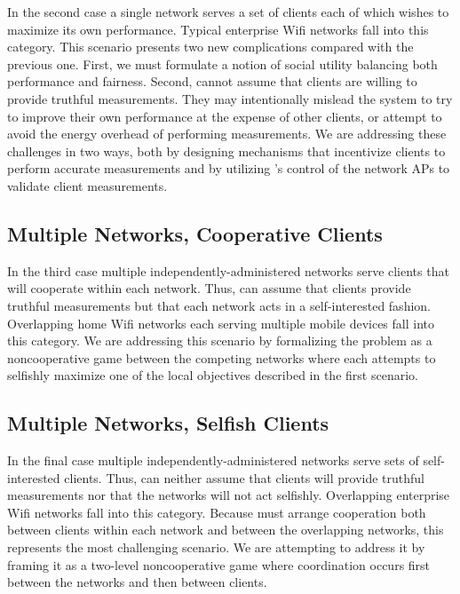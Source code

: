 In the second case a single network serves a set of clients each of which
wishes to maximize its own performance. Typical enterprise Wifi networks fall
into this category. This scenario presents two new complications compared
with the previous one. First, we must formulate a notion of social utility
balancing both performance and fairness. Second, \PS{} cannot assume that
clients are willing to provide truthful measurements. They may intentionally
mislead the system to try to improve their own performance at the expense of
other clients, or attempt to avoid the energy overhead of performing
measurements. We are addressing these challenges in two ways, both by
designing mechanisms that incentivize clients to perform accurate
measurements and by utilizing \PS{}'s control of the network APs to validate
client measurements.

\subsection{Multiple Networks, Cooperative Clients}

In the third case multiple independently-administered networks serve clients
that will cooperate within each network. Thus, \PS{} can assume that clients
provide truthful measurements but that each network acts in a self-interested
fashion. Overlapping home Wifi networks each serving multiple mobile devices
fall into this category. We are addressing this scenario by formalizing the
problem as a noncooperative game between the competing networks where each
attempts to selfishly maximize one of the local objectives described in the
first scenario.

\subsection{Multiple Networks, Selfish Clients}

In the final case multiple independently-administered networks serve sets of
self-interested clients. Thus, \PS{} can neither assume that clients will
provide truthful measurements nor that the networks will not act selfishly.
Overlapping enterprise Wifi networks fall into this category. Because \PS{}
must arrange cooperation both between clients within each network and between
the overlapping networks, this represents the most challenging scenario. We
are attempting to address it by framing it as a two-level noncooperative game
where coordination occurs first between the networks and then between
clients.
